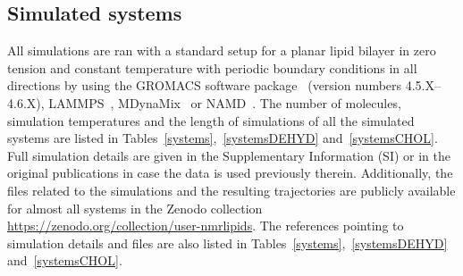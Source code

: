 \documentclass[journal=jacsat,manuscript=article]{achemso}
\begin{document}
\subsection{Simulated systems}
All simulations are ran with a standard setup for a planar lipid bilayer in zero tension and constant temperature
with periodic boundary conditions in all directions by using the GROMACS software package~\cite{hess08} 
(version numbers 4.5.X--4.6.X), LAMMPS~\cite{plimpton95}, MDynaMix~\cite{Lyubartsev00} or NAMD~\cite{phillips05}.
The number of molecules, simulation temperatures and the length of simulations of all the simulated systems 
are listed in Tables~\ref{systems},~\ref{systemsDEHYD} and~\ref{systemsCHOL}. Full simulation
details are given in the Supplementary Information (SI) or in the original publications in case the
data is used previously therein. Additionally, the files related to the simulations and the resulting trajectories are publicly
available for almost all systems in the Zenodo collection \url{https://zenodo.org/collection/user-nmrlipids}. 
The references pointing to simulation details and files are also listed in Tables~\ref{systems},~\ref{systemsDEHYD} and~\ref{systemsCHOL}.
\end{document}

